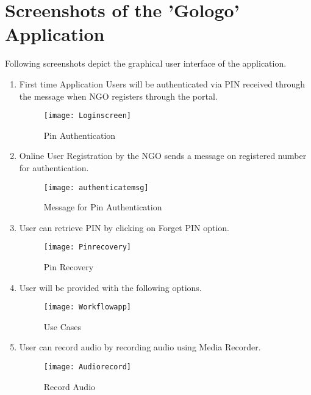\chapter{Screenshots of the 'Gologo' Application}

Following screenshots depict the graphical user interface of the application.

\begin {enumerate}
\item First time Application Users will be authenticated via PIN received through the message when NGO registers through the portal.
\begin{figure}[H]
\begin{center}   
\texttt{[image: Loginscreen]}
\caption{Pin Authentication}
\label{fig:pin_authenticate}
\end{center}
\end{figure}

\item Online User Registration by the NGO sends a message on registered number for authentication.
\begin{figure}[H]
\begin{center}   
\texttt{[image: authenticatemsg]}
\caption{Message for Pin Authentication}
\label{fig:authenticatemsg}
\end{center}
\end{figure}

\item User can retrieve PIN by clicking on Forget PIN option.
\begin{figure}[H]
\begin{center}   
\texttt{[image: Pinrecovery]}
\caption{Pin Recovery}
\label{fig:pin_recovery}
\end{center}
\end{figure}

\item User will be provided with the following options.
\begin{figure}[H]
\begin{center}   
\texttt{[image: Workflowapp]}
\caption{Use Cases}
\label{fig:menuoptions}
\end{center}
\end{figure}

\item User can record audio by recording audio using Media Recorder.
\begin{figure}[H]
\begin{center}   
\texttt{[image: Audiorecord]}
\caption{Record Audio}
\label{fig:audio1}
\end{center}
\end{figure}


\end{enumerate}
